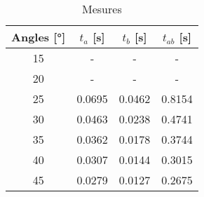 \begin{table}
\centering
\begin{tabular}{|c|c|c|c|}
\hline
Angles [°] & $t_a$ [s] & $t_b$ [s] & $t_{ab}$ [s] \\
\hline
15 & - & - & - \\
\hline
20 & - & - & - \\
\hline
25 & 0.0695 & 0.0462 & 0.8154 \\
\hline
30 & 0.0463 & 0.0238 & 0.4741 \\
\hline
35 & 0.0362 & 0.0178 & 0.3744 \\
\hline
40 & 0.0307 & 0.0144 & 0.3015 \\
\hline
45 & 0.0279 & 0.0127 & 0.2675 \\
\hline
\end{tabular}
\caption{Mesures}
\label{table:mesurepp}
\end{table}
